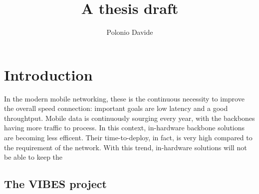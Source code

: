 \documentclass[10pt]{book}
\author{Polonio Davide}
\title{A thesis draft}
\begin{document}
 \maketitle
 

 
 \chapter{Introduction}
 
 In the modern mobile networking, these is the continuous necessity to 
improve the overall speed connection: important goals are low latency and a 
good throughtput. Mobile data is continuously sourging every year, with the 
backbones having more traffic to process. In this context, in-hardware backbone 
solutions are becoming less efficent. Their time-to-deploy, in fact, is very 
high compared to the requirement of the network. With this trend, in-hardware 
solutions will not be able to keep the 
 
 \section{The VIBES project}
\end{document}
